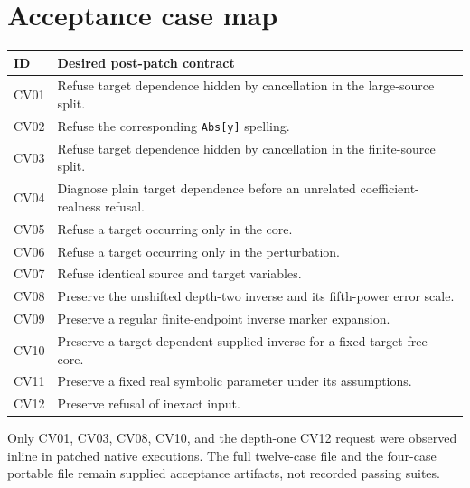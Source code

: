 \documentclass[11pt,letterpaper]{article}
\theoremstyle{remark}\newtheorem{remark}[theorem]{Remark}
\newcommand{\code}[1]{\texttt{#1}}
\begin{document}
\section{Acceptance case map}
\begin{longtable}{@{}lp{}@{}}
\toprule
ID & Desired post-patch contract\\
\midrule\endhead
CV01 & Refuse target dependence hidden by cancellation in the large-source split.\\
CV02 & Refuse the corresponding \code{Abs[y]} spelling.\\
CV03 & Refuse target dependence hidden by cancellation in the finite-source split.\\
CV04 & Diagnose plain target dependence before an unrelated coefficient-realness refusal.\\
CV05 & Refuse a target occurring only in the core.\\
CV06 & Refuse a target occurring only in the perturbation.\\
CV07 & Refuse identical source and target variables.\\
CV08 & Preserve the unshifted depth-two inverse and its fifth-power error scale.\\
CV09 & Preserve a regular finite-endpoint inverse marker expansion.\\
CV10 & Preserve a target-dependent supplied inverse for a fixed target-free core.\\
CV11 & Preserve a fixed real symbolic parameter under its assumptions.\\
CV12 & Preserve refusal of inexact input.\\
\bottomrule
\end{longtable}
Only CV01, CV03, CV08, CV10, and the depth-one CV12 request were observed inline
in patched native executions. The full twelve-case file and the four-case
portable file remain supplied acceptance artifacts, not recorded passing suites.
\end{document}
